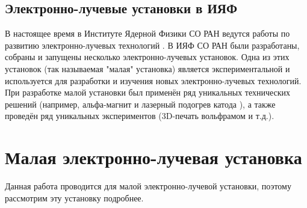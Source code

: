 \documentclass[14pt,russian,a4paper]{extarticle}
\begin{document}
\subsection{Электронно-лучевые установки в ИЯФ}
В настоящее время в Институте Ядерной Физики СО РАН ведутся работы по развитию электронно-лучевых технологий \cite{weld_coord}. В ИЯФ СО РАН были разработаны, собраны и запущены несколько электронно-лучевых установок. Одна из этих установок (так называемая "малая" установка) является экспериментальной и используется для разработки и изучения новых электронно-лучевых технологий. При разработке малой установки был применён ряд уникальных технических решений (например, альфа-магнит \cite{alpha_magnet} и лазерный подогрев катода \cite{laser_heat}), а также проведён ряд уникальных экспериментов (3D-печать вольфрамом \cite{wolfram_3d} и т.д.).

\section{Малая электронно-лучевая установка}
Данная работа проводится для малой электронно-лучевой установки, поэтому рассмотрим эту установку подробнее.
\end{document}
